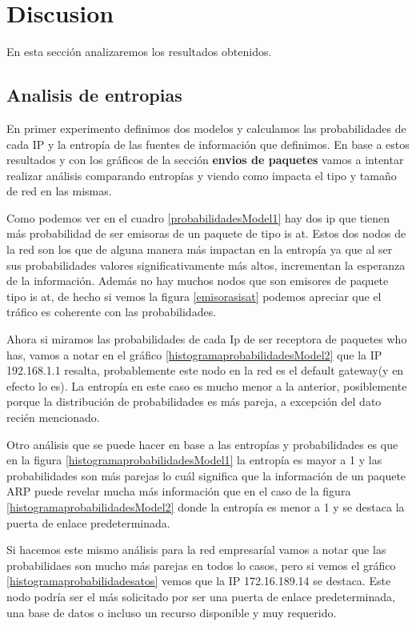 \section{Discusion}

En esta sección analizaremos los resultados obtenidos.

\subsection{Analisis de entropias}

En primer experimento definimos dos modelos y calculamos las probabilidades de cada IP y la entropía de las fuentes de información
que definimos. En base a estos resultados y con los gráficos de la sección \textbf{envios de paquetes} vamos a intentar realizar análisis
comparando entropías y viendo como impacta el tipo y tamaño de red en las mismas.

Como podemos ver en el cuadro \ref{probabilidadesModel1} hay dos ip que tienen más probabilidad de ser emisoras de un paquete de tipo is at.
Estos dos nodos de la red son los que de alguna manera más impactan en la entropía ya que al ser sus probabilidades valores significativamente más 
altos, incrementan la esperanza de la información.
Además no hay muchos nodos que son emisores de paquete tipo is at, de hecho si vemos la figura \ref{emisorasisat} podemos apreciar que
el tráfico es coherente con las probabilidades.
 
Ahora si miramos las probabilidades de cada Ip de ser receptora de paquetes who has, vamos a notar en el gráfico \ref{histogramaprobabilidadesModel2}
que la IP 192.168.1.1 resalta, probablemente este nodo en la red es el default gateway(y en efecto lo es).
 La entropía en este caso es mucho menor a la anterior, posiblemente porque la distribución de probabilidades es más
pareja, a excepción del dato recién mencionado. 

Otro análisis que se puede hacer en base a las entropías y probabilidades es que en la figura \ref{histogramaprobabilidadesModel1} 
la entropía es mayor a 1 y las probabilidades son más parejas lo cuál significa que la información de un paquete ARP puede revelar 
mucha más información que en el caso de la figura \ref{histogramaprobabilidadesModel2} donde la entropía es menor a 1 y se
destaca la puerta de enlace predeterminada.

Si hacemos este mismo análisis para la red empresaríal vamos a notar que las probabilidaes son mucho más parejas en todos lo casos, pero
si vemos el gráfico \ref{histogramaprobabilidadesatos} vemos que la IP 172.16.189.14 se destaca. Este nodo podría ser el 
más solicitado por ser una puerta de enlace predeterminada, una base de datos o incluso un recurso disponible y muy requerido.

